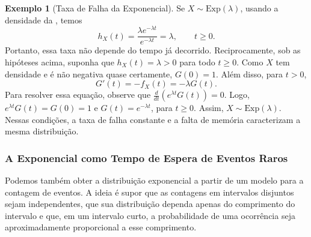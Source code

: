 \documentclass[12pt,portuguese]{article}
\theoremstyle{definition}
\newtheorem{example}[example]{Exemplo}
\theoremstyle{plainexercise}
\theoremstyle{starredexercise}
\theoremstyle{definition}
\begin{document}
\begin{example}[Taxa de Falha da Exponencial]\label{ex:taxa-falha-exponencial}
Se $X\sim\mathrm{Exp}(\lambda)$, usando a densidade da
, temos
\[
  h_X(t)=\frac{\lambda e^{-\lambda t}}{e^{-\lambda t}}=\lambda,
  \qquad t\geqslant0.
\]
Portanto, essa taxa não depende do tempo já decorrido. Reciprocamente,
sob as hipóteses acima, suponha que $h_X(t)=\lambda>0$ para todo
$t\geqslant0$. Como $X$ tem densidade e é não negativa quase certamente,
$G(0)=1$. Além disso, para $t>0$,
\[
  G'(t)=-f_X(t)=-\lambda G(t).
\]
Para resolver essa equação, observe que
$\frac{d}{dt}(e^{\lambda t}G(t))=0$. Logo,
$e^{\lambda t}G(t)=G(0)=1$ e $G(t)=e^{-\lambda t}$, para
$t\geqslant0$. Assim, $X\sim\mathrm{Exp}(\lambda)$. Nessas condições,
a taxa de falha constante e a falta de memória caracterizam a mesma
distribuição.
\end{example}

\subsubsection{A Exponencial como Tempo de Espera de Eventos Raros}

Podemos também obter a distribuição exponencial a partir de um modelo
para a contagem de eventos. A ideia é supor que as contagens em intervalos
disjuntos sejam independentes, que sua distribuição dependa apenas do
comprimento do intervalo e que, em um intervalo curto, a probabilidade
de uma ocorrência seja aproximadamente proporcional a esse comprimento.
\end{document}
